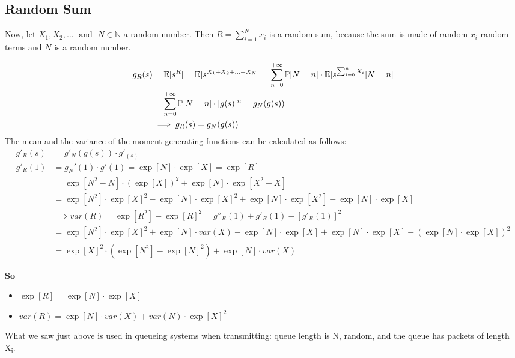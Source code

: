 \subsection{Random Sum}
Now, let $X_1, X_2, \dotsc \; \text{ and }\; N \in \mathbb{N}$ a random number. Then $R=\sum\limits_{i=1}^{N}x_i$
is a random sum, because the sum is made of random $x_i$ random terms and $N$ is a random number.

\begin{equation}
  \begin{split}
    g_R(s)&=\mathbb{E}[s^R]=\mathbb{E}[s^{X_1+X_2+\dotsc+X_N}]=\sum\limits_{n=0}^{+\infty} \mathbb{P}[N=n]\cdot \mathbb{E}[s^{\sum_{i=0}^{n}X_i}|N=n]\\
    &=\sum\limits_{n=0}^{+\infty} \mathbb{P}[N=n]\cdot [g(s)]^n=g_N(g(s))
    \\ & \implies g_R(s) = g_N(g(s))
  \end{split}
\end{equation}
The mean and the variance of the moment generating functions can be calculated as follows:
\begin{equation}\begin{split}
  g'_R(s) &= g'_N(g(s)) \cdot g'_(s) \\
  g'_R(1) &= g_N'(1)\cdot g'(1) = \exp[N]\cdot \exp[X]=\exp[R]\\
  &=\exp[N^2-N]\cdot (\exp[X])^2 + \exp[N]\cdot \exp[X^2-X] \\
  &=\exp[N^2]\cdot \exp[X]^2 - \exp[N] \cdot \exp[X]^2 +\exp[N]\cdot \exp[X^2] - \exp[N]\cdot \exp[X]\\
  & \implies var(R) = \exp[R^2]-\exp[R]^2 = g''_R(1)+g'_R(1)-[g'_R(1)]^2\\
  &=\exp[N^2] \cdot \exp[X]^2 + \exp[N] \cdot var(X) - \exp[N]\cdot \exp[X] + \exp[N] \cdot \exp[X] - (\exp[N] \cdot \exp[X])^2 \\
  &= \exp[X]^2 \cdot (\exp[N^2]-\exp[N]^2) + \exp[N] \cdot var(X)
\end{split}
\end{equation}

\textbf{So}
\begin{itemize}
  \item $\exp[R] = \exp[N] \cdot \exp[X]$
  \item $var(R) = \exp[N] \cdot var(X) + var(N) \cdot \exp[X]^2$
\end{itemize}

What we saw just above is used in queueing systems when transmitting: queue length is N, random,
and the queue has packets of length X\textsubscript{i}.

